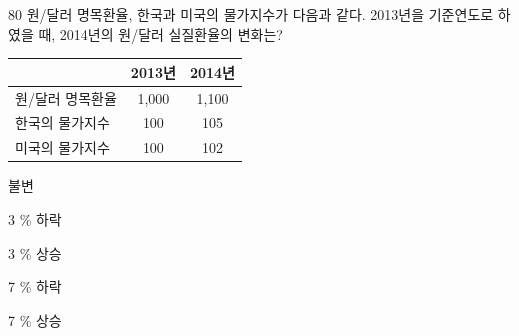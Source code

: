 \begin{question}{80}
원/달러 명목환율, 한국과 미국의 물가지수가 다음과 같다. 2013년을 기준연도로 하였을 때, 2014년의 원/달러 실질환율의 변화는?
\par{\small\centering\begin{tabular}{|l|c|c|}\hline
 & 2013년 & 2014년 \\ \hline
원/달러 명목환율 & 1,000 & 1,100 \\ \hline
한국의 물가지수 & 100 & 105 \\ \hline
미국의 물가지수 & 100 & 102 \\ \hline
\end{tabular}\par}
\begin{choices}
  \item 불변
  \item 3 \% 하락
  \item 3 \% 상승
  \item 7 \% 하락
  \item 7 \% 상승
\end{choices}
\end{question}
